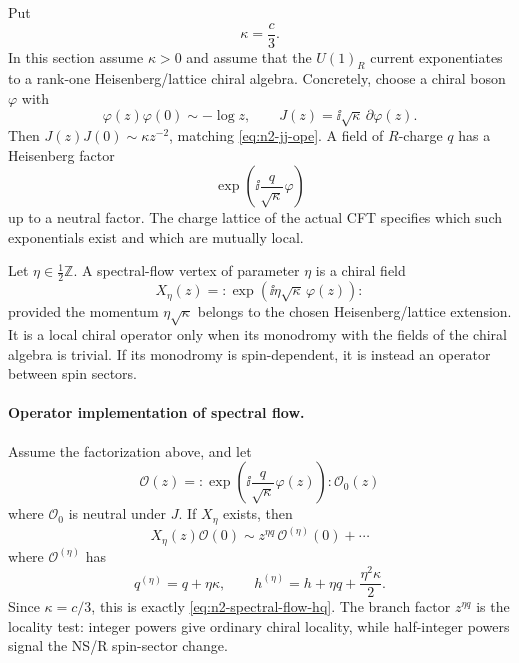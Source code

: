 Put
\[
  \kappa=\frac c3 .
\]
In this section assume \(\kappa>0\) and assume that the \(U(1)_R\) current
exponentiates to a rank-one Heisenberg/lattice chiral algebra.  Concretely,
choose a chiral boson \(\varphi\) with
\begin{equation}
  \varphi(z)\varphi(0)\sim-\log z,
  \qquad
  J(z)=\ii\sqrt{\kappa}\,\partial\varphi(z).
  \label{eq:n2-r-current-bosonization}
\end{equation}
Then \(J(z)J(0)\sim\kappa z^{-2}\), matching
\eqref{eq:n2-jj-ope}.  A field of \(R\)-charge \(q\) has a Heisenberg
factor
\[
  \exp\left(\ii\frac{q}{\sqrt\kappa}\varphi\right)
\]
up to a neutral factor.  The charge lattice of the actual CFT specifies
which such exponentials exist and which are mutually local.

\begin{definition}
\label{def:n2-spectral-flow-vertex}
Let \(\eta\in\frac12\mathbb Z\).  A spectral-flow vertex of parameter
\(\eta\) is a chiral field
\begin{equation}
  X_\eta(z)
  =
  :\exp\left(\ii\eta\sqrt{\kappa}\,\varphi(z)\right):
  \label{eq:n2-spectral-flow-vertex}
\end{equation}
provided the momentum \(\eta\sqrt{\kappa}\) belongs to the chosen
Heisenberg/lattice extension.  It is a local chiral operator only when its
monodromy with the fields of the chiral algebra is trivial.  If its
monodromy is spin-dependent, it is instead an operator between spin sectors.
\end{definition}

\paragraph{Operator implementation of spectral flow.}
Assume the factorization above, and let
\[
  \mathcal O(z)
  =
  :\exp\left(\ii\frac{q}{\sqrt\kappa}\varphi(z)\right):
  \mathcal O_0(z)
\]
where \(\mathcal O_0\) is neutral under \(J\).  If \(X_\eta\) exists, then
\begin{equation}
  X_\eta(z)\mathcal O(0)
  \sim
  z^{\eta q}\,
  \mathcal O^{(\eta)}(0)+\cdots
  \label{eq:n2-spectral-flow-vertex-ope-with-field}
\end{equation}
where \(\mathcal O^{(\eta)}\) has
\begin{equation}
  q^{(\eta)}=q+\eta\kappa,
  \qquad
  h^{(\eta)}=h+\eta q+\frac{\eta^2\kappa}{2}.
  \label{eq:n2-spectral-flow-vertex-hq}
\end{equation}
Since \(\kappa=c/3\), this is exactly
\eqref{eq:n2-spectral-flow-hq}.  The branch factor \(z^{\eta q}\) is the
locality test: integer powers give ordinary chiral locality, while
half-integer powers signal the NS/R spin-sector change.

